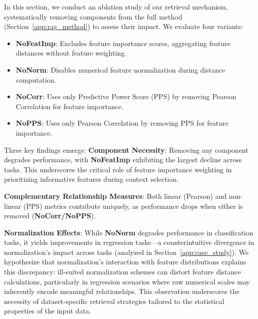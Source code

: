In this section, we conduct an ablation study of our retrieval mechanism, systematically removing components from the full method (Section~\ref{app:rag_method}) to assess their impact. We evaluate four variants:
\begin{itemize}
\item \textbf{NoFeatImp}: Excludes feature importance scores, aggregating feature distances without feature weighting.
\item \textbf{NoNorm}: Disables numerical feature normalization during distance computation.
\item \textbf{NoCorr}: Uses only Predictive Power Score (PPS) by removing Pearson Correlation for feature importance.
\item \textbf{NoPPS}: Uses only Pearson Correlation by removing PPS for feature importance.
\end{itemize}

Three key findings emerge:
\textbf{Component Necessity}: Removing any component degrades performance, with \textbf{NoFeatImp} exhibiting the largest decline across tasks. This underscores the critical role of feature importance weighting in prioritizing informative features during context selection.

\textbf{Complementary Relationship Measures}: Both linear (Pearson) and non-linear (PPS) metrics contribute uniquely, as performance drops when either is removed (\textbf{NoCorr/NoPPS}).

\textbf{Normalization Effects}: While \textbf{NoNorm} degrades performance in classification tasks, it yields improvements in regression tasks—a counterintuitive divergence in normalization’s impact across tasks (analyzed in Section~\ref{app:case_study}). We hypothesize that normalization’s interaction with feature distributions explains this discrepancy: ill-suited normalization schemes can distort feature distance calculations, particularly in regression scenarios where raw numerical scales may inherently encode meaningful relationships. This observation underscores the necessity of dataset-specific retrieval strategies tailored to the statistical properties of the input data.


